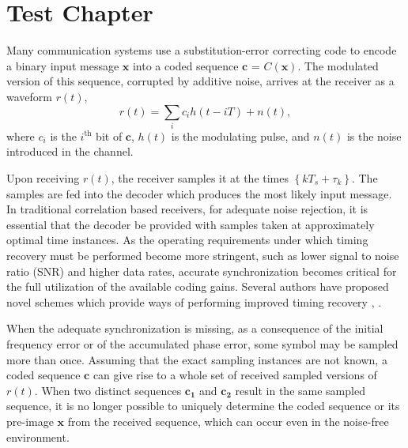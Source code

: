 %
\newcommand{\nchoosek}[2]{\left(\begin{array}{c}#1\\#2\end{array}\right)}
\chapter[Test Chapter]{Test Chapter}
Many communication systems use a substitution-error correcting
code to encode a binary input message $\mathbf{x}$ into a coded
sequence $\mathbf{c}$ = $C(\mathbf{x})$. The modulated version of
this sequence, corrupted by additive noise, arrives at the
receiver as a waveform $r(t)$,
\begin{equation}\label{eq:rt}
r(t)=\sum_{i} c_i h(t-iT) +n(t),
\end{equation}
where $c_i$ is the $i^{\text{th}}$ %
bit of $\mathbf{c}$, $h(t)$ is the modulating pulse, and $n(t)$ is
the noise introduced in the channel.

Upon receiving $r(t)$, the receiver samples it at the times
$\left\{kT_s+\tau_k\right\} $. The samples are fed into the
decoder which produces the most likely input message. In
traditional correlation based receivers, for adequate noise
rejection, it is essential that the decoder be provided with
samples taken at approximately optimal time instances. As the
operating requirements under which timing recovery must be
performed become more stringent, such as lower signal to noise
ratio (SNR) and higher data rates, accurate synchronization
becomes critical for the full utilization of the available coding
gains. Several authors have proposed novel schemes which provide
ways of performing improved timing recovery \cite{liu:02},
\cite{kbek:04}.

When the adequate synchronization is missing, as a consequence of
the initial frequency error or of the accumulated phase error,
some symbol may be sampled more than once. Assuming that the exact
sampling instances are not known, a coded sequence $\mathbf{c}$
can give rise to a whole set of received sampled versions of
$r(t)$. When two distinct sequences $\mathbf{c_1}$ and
$\mathbf{c_2}$ result in the same sampled sequence, it is no
longer possible to uniquely determine the coded sequence or its
pre-image $\mathbf{x}$ from the received sequence, which can occur
even in the noise-free environment.

